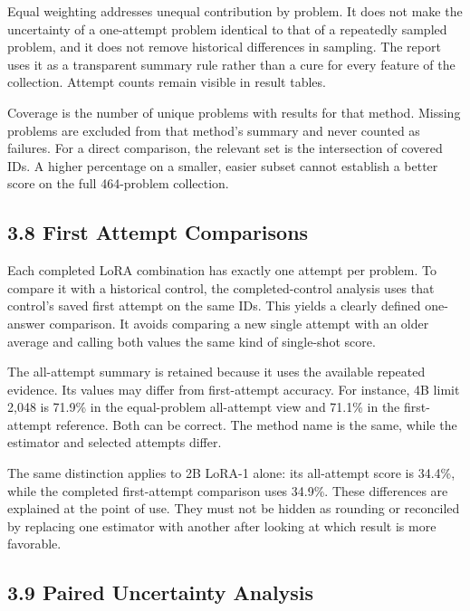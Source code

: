 \documentclass[11pt,letterpaper]{article}
\begin{document}
Equal weighting addresses unequal contribution by problem. It does not make the uncertainty of a one-attempt problem identical to that of a repeatedly sampled problem, and it does not remove historical differences in sampling. The report uses it as a transparent summary rule rather than a cure for every feature of the collection. Attempt counts remain visible in result tables.\par

Coverage is the number of unique problems with results for that method. Missing problems are excluded from that method's summary and never counted as failures. For a direct comparison, the relevant set is the intersection of covered IDs. A higher percentage on a smaller, easier subset cannot establish a better score on the full 464-problem collection.\par

\subsection*{3.8 First Attempt Comparisons}

Each completed LoRA combination has exactly one attempt per problem. To compare it with a historical control, the completed-control analysis uses that control's saved first attempt on the same IDs. This yields a clearly defined one-answer comparison. It avoids comparing a new single attempt with an older average and calling both values the same kind of single-shot score.\par

The all-attempt summary is retained because it uses the available repeated evidence. Its values may differ from first-attempt accuracy. For instance, 4B limit 2,048 is 71.9\% in the equal-problem all-attempt view and 71.1\% in the first-attempt reference. Both can be correct. The method name is the same, while the estimator and selected attempts differ.\par

The same distinction applies to 2B LoRA-1 alone: its all-attempt score is 34.4\%, while the completed first-attempt comparison uses 34.9\%. These differences are explained at the point of use. They must not be hidden as rounding or reconciled by replacing one estimator with another after looking at which result is more favorable.\par

\subsection*{3.9 Paired Uncertainty Analysis}
\end{document}
